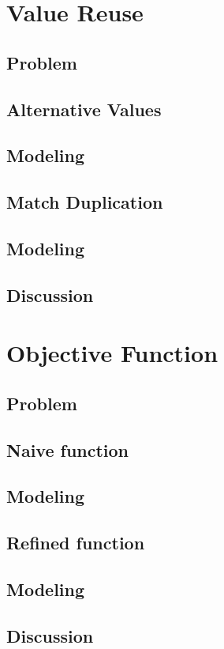 \documentclass{kthdiss}
\begin{document}
\chapter{Value Reuse}
\section{Problem}
\section{Alternative Values}
\section{Modeling}
\section{Match Duplication}
\section{Modeling}
\section{Discussion}

\chapter{Objective Function}
\section{Problem}
\section{Naive function}
\section{Modeling}
\section{Refined function}
\section{Modeling}
\section{Discussion}
\end{document}
